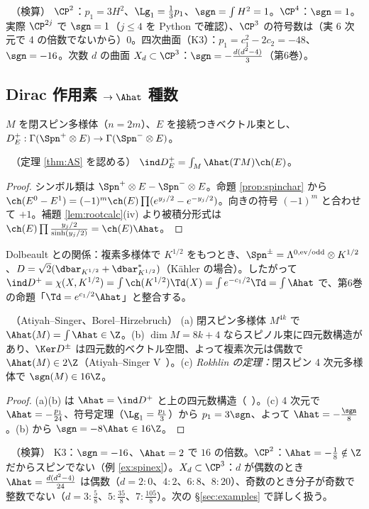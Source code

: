 \begin{ex}\label{ex:signCP2}\tP\ （検算）
$\CP^2$：$p_1=3H^2$、$\Lg_1=\frac13p_1$、$\sgn=\int H^2=1$。$\CP^4$：$\sgn=1$。実際 $\CP^{2j}$ で $\sgn=1$（$j\le4$ を Python で確認）、$\CP^3$ の符号数は（実 6 次元で 4 の倍数でないから）$0$。四次曲面（K3）：$p_1=c_1^2-2c_2=-48$、$\sgn=-16$。次数 $d$ の曲面 $X_d\subset\CP^3$：$\sgn=-\frac{d(d^2-4)}3$（第6巻）。
\end{ex}

\subsection{Dirac 作用素 $\to\Ahat$ 種数}
$M$ を閉スピン多様体（$n=2m$）、$E$ を接続つきベクトル束とし、$D_E^+:\Gamma(\Spn^+\otimes E)\to\Gamma(\Spn^-\otimes E)$。
\begin{thm}\label{thm:DiracAS}\tP\ （定理 \ref{thm:AS} を認める）
$\ind D_E^+=\int_M\Ahat(TM)\ch(E)$。
\end{thm}
\begin{proof}
シンボル類は $\Spn^+\otimes E-\Spn^-\otimes E$。命題 \ref{prop:spinchar} から $\ch(E^0-E^1)=(-1)^m\ch(E)\prod(e^{y_j/2}-e^{-y_j/2})$。向きの符号 $(-1)^m$ と合わせて $+1$。補題 \ref{lem:rootcalc}(iv) より被積分形式は $\ch(E)\prod\frac{y_j/2}{\sinh(y_j/2)}=\ch(E)\Ahat$。
\end{proof}
Dolbeault との関係：複素多様体で $K^{1/2}$ をもつとき、$\Spn^\pm=\Lambda^{0,{\rm ev/odd}}\otimes K^{1/2}$、$D=\sqrt2(\dbar_{K^{1/2}}+\dbar_{K^{1/2}}^*)$（Kähler の場合）。したがって $\ind D^+=\chi(X,K^{1/2})=\int\ch(K^{1/2})\Td(X)=\int e^{-c_1/2}\Td=\int\Ahat$ で、第6巻の命題「$\Td=e^{c_1/2}\Ahat$」と整合する。
\begin{cor}\label{cor:Ahatint}\tC\ （Atiyah--Singer、Borel--Hirzebruch）
(a) 閉スピン多様体 $M^{4k}$ で $\Ahat(M)=\int\Ahat\in\Z$。(b) $\dim M=8k+4$ ならスピノル束に四元数構造があり、$\Ker D^\pm$ は四元数的ベクトル空間、よって複素次元は偶数で $\Ahat(M)\in2\Z$（Atiyah--Singer V\tQ\ ）。(c) \emph{Rokhlin の定理：}閉スピン 4 次元多様体で $\sgn(M)\in16\Z$。
\end{cor}
\begin{proof}
(a)(b) は $\Ahat=\ind D^+$ と上の四元数構造（\tC\ ）。(c) 4 次元で $\Ahat=-\frac{p_1}{24}$、符号定理（$\Lg_1=\frac{p_1}3$）から $p_1=3\sgn$、よって $\Ahat=-\frac{\sgn}8$。(b) から $\sgn=-8\Ahat\in16\Z$。
\end{proof}
\begin{ex}\label{ex:Rokhlin}\tP\ （検算）
K3：$\sgn=-16$、$\Ahat=2$ で $16$ の倍数。$\CP^2$：$\Ahat=-\frac18\notin\Z$ だからスピンでない（例 \ref{ex:spinex}）。$X_d\subset\CP^3$：$d$ が偶数のとき $\Ahat=\frac{d(d^2-4)}{24}$ は偶数（$d=2:0$、$4:2$、$6:8$、$8:20$）、奇数のとき分子が奇数で整数でない（$d=3:\frac58$、$5:\frac{35}8$、$7:\frac{105}8$）。次の \S\ref{sec:examples} で詳しく扱う。
\end{ex}
